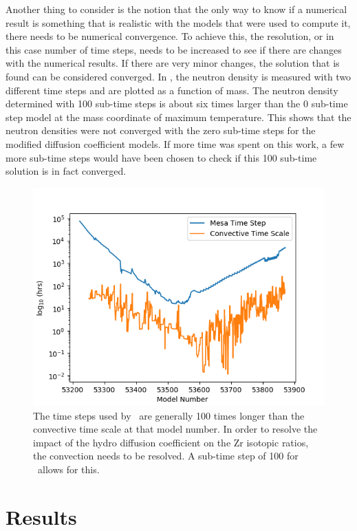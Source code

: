 \documentclass[fleqn,usenatbib]{mnras}
\begin{document}
Another thing to consider is the notion that the only way to know if a numerical result is something that is realistic with the models that were used to compute it, there needs to be numerical convergence. To achieve this, the resolution, or in this case number of time steps, needs to be increased to see if there are changes with the numerical results. If there are very minor changes, the solution that is found can be considered converged. In , the neutron density is measured with two different time steps and are plotted as a function of mass. The neutron density determined with 100 sub-time steps is about six times larger than the 0 sub-time step model at the mass coordinate of maximum temperature. This shows that the neutron densities were not converged with the zero sub-time steps for the modified diffusion coefficient models. If more time was spent on this work, a few more sub-time steps would have been chosen to check if this 100 sub-time solution is in fact converged.

\begin{figure}
  \includegraphics[width=\columnwidth]{figs/Time_scale.png}
  \caption{The time steps used by \MESA~are generally 100 times longer than the convective time scale at that model number. In order to resolve the impact of the hydro diffusion coefficient on the Zr isotopic ratios, the convection needs to be resolved. A sub-time step of 100 for \mppnp~allows for this.} 
\end{figure}

\section{Results}
\end{document}
